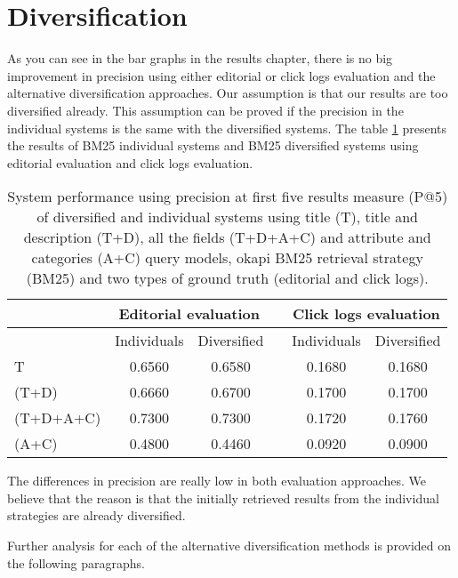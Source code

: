 \section{Diversification}

As you can see in the bar graphs in the results chapter, there is no big improvement in precision using either editorial or click logs evaluation and the alternative diversification approaches. Our assumption is that our results are too diversified already. This assumption can be proved if the precision in the individual systems is the same with the diversified systems. The table \ref{table:MMRP5} presents the results of BM25 individual systems and BM25 diversified systems using editorial evaluation and click logs evaluation.



\begin{table}[H]
\footnotesize
\begin{center}
\caption{System performance   using precision at first five results measure (P@5) of diversified and individual systems using title (T), title and description (T+D), all the fields (T+D+A+C) and attribute and categories (A+C) query models, okapi BM25 retrieval strategy (BM25) and two types of ground truth (editorial and click logs).
}
\label{table:MMRP5}

\begin{tabular}{lccccc}
\toprule
 & \multicolumn{2}{c}{Editorial evaluation} &   & \multicolumn{2}{c}{Click logs evaluation} \\
\midrule
 & Individuals & Diversified &   & Individuals & Diversified \\
\midrule
T & 0.6560 & 0.6580 &   & 0.1680 & 0.1680 \\
(T+D) & 0.6660 & 0.6700 &   & 0.1700 & 0.1700 \\
(T+D+A+C) & 0.7300 & 0.7300 &   & 0.1720 & 0.1760 \\
(A+C) & 0.4800 & 0.4460 &   & 0.0920 & 0.0900 \\
\bottomrule
\end{tabular}
\end{center}
\end{table}


The differences in precision are really low in both evaluation approaches. We believe that the reason is that the initially retrieved results from the individual strategies are already diversified.

Further analysis for each of the alternative diversification methods is provided on the following paragraphs.

